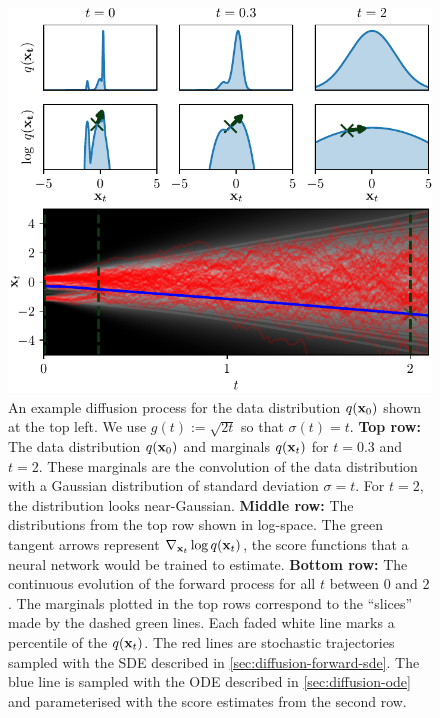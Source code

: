 \begin{figure}
    \centering
    \includegraphics[scale=1]{figs/thesis/diffusion_process.pdf}
    \caption{An example diffusion process for the data distribution $q({\mathbf{x}}_0)$ shown at the top left. We use $g(t) := \sqrt{2t}$ so that $\sigma(t)     = t$. \textbf{Top row:} The data distribution $q({\mathbf{x}}_0)$ and marginals $q({\mathbf{x}}_t)$ for $t=0.3$ and $t=2$. These marginals are the convolution of the data distribution with a Gaussian distribution of standard deviation $\sigma = t$. For $t=2$, the distribution looks near-Gaussian. \textbf{Middle row:} The distributions from the top row shown in log-space. The green tangent arrows represent $\nabla_{{\mathbf{x}}_t} \log q({\mathbf{x}}_t)$, the score functions that a neural network would be trained to estimate. \textbf{Bottom row:} The continuous evolution of the forward process for all $t$ between $0$ and $2$. The marginals plotted in the top rows correspond to the ``slices'' made by the dashed green lines. Each faded white line marks a percentile of the $q({\mathbf{x}}_t)$. The red lines are stochastic trajectories sampled with the SDE described in \cref{sec:diffusion-forward-sde}. The blue line is sampled with the ODE described in \cref{sec:diffusion-ode} and parameterised with the score estimates from the second row.}
    \label{fig:diffusion-overview}
\end{figure}


